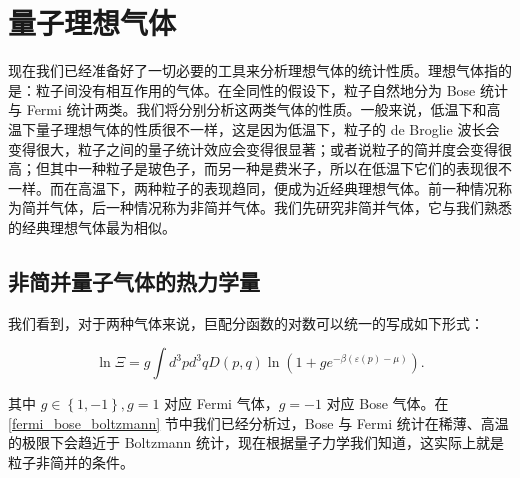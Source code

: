 \chapter{量子理想气体}
现在我们已经准备好了一切必要的工具来分析理想气体的统计性质。理想气体指的是：粒子间没有相互作用的气体。在全同性的假设下，粒子自然地分为 Bose 统计与 Fermi 统计两类。我们将分别分析这两类气体的性质。一般来说，低温下和高温下量子理想气体的性质很不一样，这是因为低温下，粒子的 de Broglie 波长会变得很大，粒子之间的量子统计效应会变得很显著；或者说粒子的简并度会变得很高；但其中一种粒子是玻色子，而另一种是费米子，所以在低温下它们的表现很不一样。而在高温下，两种粒子的表现趋同，便成为近经典理想气体。前一种情况称为简并气体，后一种情况称为非简并气体。我们先研究非简并气体，它与我们熟悉的经典理想气体最为相似。
\section{非简并量子气体的热力学量}
我们看到，对于两种气体来说，巨配分函数的对数可以统一的写成如下形式：
\begin{linenomath}\begin{equation}
    \ln \varXi = g \int d^3p d^3 q D(p,q)\ln \left( 1 +g e^{-\beta(\varepsilon(p) - \mu)} \right).
\end{equation}\end{linenomath}
其中 $g\in\left\{ 1,-1 \right\}, g=1$ 对应 Fermi 气体，$g=-1$ 对应 Bose 气体。在 \ref{fermi_bose_boltzmann} 节中我们已经分析过，Bose 与 Fermi 统计在稀薄、高温的极限下会趋近于 Boltzmann 统计，现在根据量子力学我们知道，这实际上就是粒子非简并的条件。

